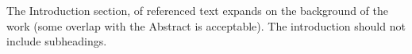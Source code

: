 \documentclass[fleqn,10pt]{wlscirep}
\begin{document}
The Introduction section, of referenced text\cite{Figueredo:2009dg} expands on the background of the work (some overlap with the Abstract is acceptable). The introduction should not include subheadings.




















\end{document}
